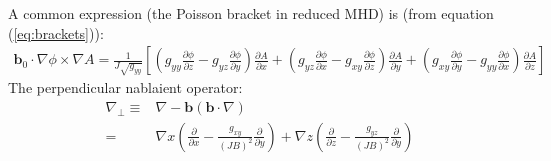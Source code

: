 \documentclass[12pt]{article}
\def\L{\left}
\def\R{\right}
\newcommand{\deriv}[2]{\ensuremath{\frac{\partial #1}{\partial #2}}}
\newcommand{\ve}[1]{\ensuremath{\boldsymbol{#1}}}
\newcommand{\bvec}{\ve{b}}
\begin{document}
%
A common expression (the Poisson bracket in reduced MHD) is (from equation
(\ref{eq:brackets})):
%
\begin{align*}
\bvec_0\cdot\nabla\phi\times\nabla A =
\frac{1}{J\sqrt{g_{yy}}}\L[\L(g_{yy}\deriv{\phi}{z} -
    g_{yz}\deriv{\phi}{y}\R)\deriv{A}{x} + \L(g_{yz}\deriv{\phi}{x} -
    g_{xy}\deriv{\phi}{z}\R)\deriv{A}{y} + \L(g_{xy}\deriv{\phi}{y} -
g_{yy}\deriv{\phi}{x}\R)\deriv{A}{z}\R]
\end{align*}
%
The perpendicular nablaient operator:
%
\begin{align*}
\nabla_\perp \equiv& \nabla - \ve{b}\L(\ve{b}\cdot\nabla\R) \\ =& \nabla
    x\L(\deriv{}{x} - \frac{g_{xy}}{\L(JB\R)^2}\deriv{}{y}\R) +
    \nabla z\L(\deriv{}{z} -
    \frac{g_{yz}}{\L(JB\R)^2}\deriv{}{y}\R)
\end{align*}
%
\end{document}
